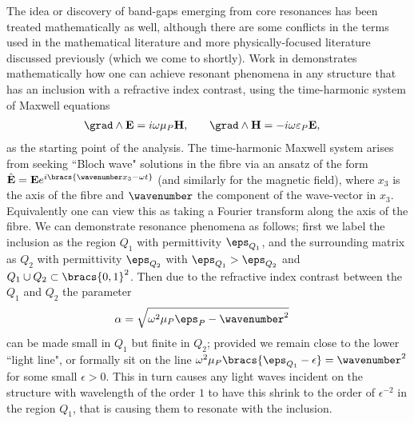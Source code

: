The idea or discovery of band-gaps emerging from core resonances has been treated mathematically as well, although there are some conflicts in the terms used in the mathematical literature and more physically-focused literature discussed previously (which we come to shortly).
Work in \cite{cooper2014band} demonstrates mathematically how one can achieve resonant phenomena in any structure that has an inclusion with a refractive index contrast, using the time-harmonic system of Maxwell equations
\begin{align*}
	\grad\wedge\mathbf{E} &= i\omega\mu_{P}\mathbf{H}, &\quad \grad\wedge\mathbf{H} &= -i\omega\varepsilon_{P}\mathbf{E},
\end{align*}
as the starting point of the analysis.
The time-harmonic Maxwell system arises from seeking ``Bloch wave" solutions in the fibre via an ansatz of the form $\hat{\mathbf{E}}=\mathbf{E}e^{i\bracs{\wavenumber x_3-\omega t}}$ (and similarly for the magnetic field), where $x_3$ is the axis of the fibre and $\wavenumber$ the component of the wave-vector in $x_3$.
Equivalently one can view this as taking a Fourier transform along the axis of the fibre.
We can demonstrate resonance phenomena as follows; first we label the inclusion as the region $Q_1$ with permittivity $\eps_{Q_1}$, and the surrounding matrix as $Q_2$ with permittivity $\eps_{Q_2}$ with $\eps_{Q_1}>\eps_{Q_2}$ and $Q_1\cup Q_2\subset\bracs{0,1}^2$.
Then due to the refractive index contrast between the $Q_1$ and $Q_2$ the parameter
\begin{align*}
	\alpha &= \sqrt{\omega^2\mu_{P}\eps_{P} - \wavenumber^2}
\end{align*}
can be made small in $Q_1$ but finite in $Q_2$; provided we remain close to the lower ``light line", or formally sit on the line $\omega^2\mu_{P}\bracs{\eps_{Q_1}-\epsilon} = \wavenumber^2$ for some small $\epsilon>0$.
This in turn causes any light waves incident on the structure with wavelength of the order $1$ to have this shrink to the order of $\epsilon^{-2}$ in the region $Q_1$, that is causing them to resonate with the inclusion.


